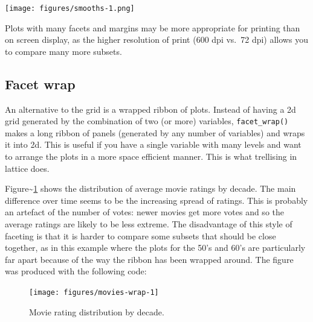 \texttt{[image: figures/smooths-1.png]}

Plots with many facets and margins may be more appropriate for printing
than on screen display, as the higher resolution of print (600 dpi
vs.~72 dpi) allows you to compare many more subsets.

\subsection{Facet wrap}\label{sub:facet-wrap}

An alternative to the grid is a wrapped ribbon of plots. Instead of
having a 2d grid generated by the combination of two (or more)
variables, \texttt{facet\_wrap()} makes a long ribbon of panels
(generated by any number of variables) and wraps it into 2d. This is
useful if you have a single variable with many levels and want to
arrange the plots in a more space efficient manner. This is what
trellising in lattice does.  

Figure\textasciitilde{}\ref{fig:movies-wrap} shows the distribution of
average movie ratings by decade. The main difference over time seems to
be the increasing spread of ratings. This is probably an artefact of the
number of votes: newer movies get more votes and so the average ratings
are likely to be less extreme. The disadvantage of this style of
faceting is that it is harder to compare some subsets that should be
close together, as in this example where the plots for the 50's and 60's
are particularly far apart because of the way the ribbon has been
wrapped around. The figure was produced with the following code:

\begin{Shaded}
\begin{Highlighting}[]
\StringTok{ }
\StringTok{ }\NormalTok{),}
  \NormalTok{, } \NormalTok{) +}\StringTok{ }
\StringTok{  }\NormalTok{(~}\StringTok{ } \NormalTok{)}
\end{Highlighting}
\end{Shaded}

\begin{figure}
\texttt{[image: figures/movies-wrap-1]} \caption{Movie rating distribution by decade.\label{fig:movies-wrap}}
\end{figure}

